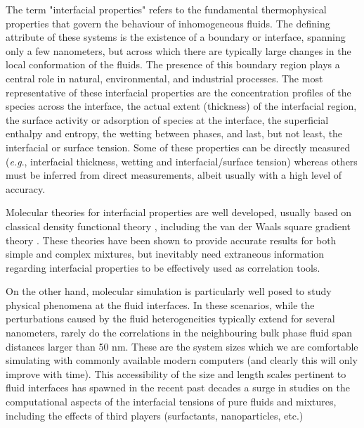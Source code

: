 \documentclass[9pt,bestpractices]{livecoms}
\begin{document}
The term "interfacial properties" refers to the fundamental thermophysical
properties that govern the behaviour of inhomogeneous fluids. The defining
attribute of these systems is the existence of a boundary or interface,
spanning only a few nanometers, but across which there are typically large
changes in the local conformation of the fluids. The presence of this boundary
region plays a central role in natural, environmental, and industrial
processes. The most representative of these interfacial properties are the
concentration profiles of the species across the interface, the actual extent
(thickness) of the interfacial region, the surface activity or adsorption of
species at the interface, the superficial enthalpy and entropy, the wetting
between phases, and last, but not least, the interfacial or surface tension.
Some of these properties can be directly measured (\textit{e.g}., interfacial
thickness, wetting and interfacial/surface tension) \citep{evans2006}
whereas others must be inferred from direct measurements, albeit
usually with a high level of accuracy. 

Molecular theories for interfacial properties are well developed, usually based
on classical density functional theory \citep{evans1992,rowlinson1982}, including the van der Waals square gradient
theory \citep{davis1982,rowlinson1982}.
These theories have been shown to provide accurate results for both simple and
complex mixtures, but inevitably need extraneous information regarding
interfacial properties to be effectively used as correlation tools.

On the other hand, molecular simulation is particularly well posed to study
physical phenomena at the fluid interfaces. In these scenarios, while the
perturbations caused by the fluid heterogeneities typically extend for several
nanometers, rarely do the correlations in the neighbouring bulk phase fluid
span distances larger than 50 nm. These are the system sizes which we are
comfortable simulating with commonly available modern computers (and
clearly this will only improve with time). This accessibility of the size and
length scales pertinent to fluid interfaces has spawned in the recent past decades a surge in studies
on the computational aspects of the interfacial
tensions of pure fluids and mixtures, including the effects of third players
(surfactants, nanoparticles, etc.) 
\end{document}
